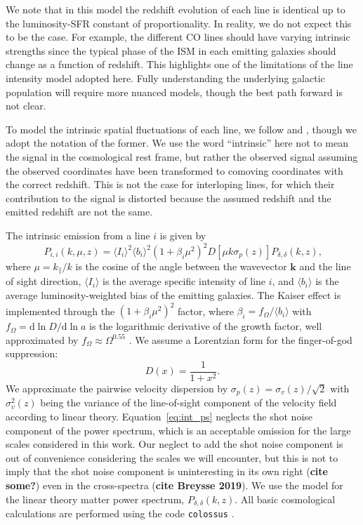 \documentclass{aastex62}
\newcommand{\beq}{\begin{equation}}
\newcommand{\eeq}{\end{equation}}
\newcommand{\avg}[1]{\ensuremath{\langle #1 \rangle}}
\begin{document}
We note that in this model the redshift evolution of each line is identical up
to the luminosity-SFR constant of proportionality. In reality, we do not
expect this to be the case. For example, the different CO lines should have
varying intrinsic strengths since the typical phase of the ISM in each
emitting galaxies should change as a function of redshift. This highlights one
of the limitations of the line intensity model adopted here. Fully
understanding the underlying galactic population will require more nuanced
models, though the best path forward is not clear.

To model the intrinsic spatial fluctuations of each line, we follow
\citet{2016ApJ...825..143L} and \citet{2016ApJ...832..165C}, though we adopt
the notation of the former. We use the word ``intrinsic'' here not to mean the
signal in the cosmological rest frame, but rather the observed signal assuming
the observed coordinates have been transformed to comoving coordinates with
the correct redshift. This is not the case for interloping lines, for which
their contribution to the signal is distorted because the assumed redshift and
the emitted redshift are not the same. 

The intrinsic emission from a line $i$ is given by
\beq\label{eq:int_ps}
P_{i,i}(k, \mu, z) = \avg{I_i}^2 \avg{b_i}^2 (1 + \beta_i \mu^2)^2 
              D\left[\mu k \sigma_p(z)\right] P_{\delta, \delta}(k, z)\text{,}
\eeq
where $\mu=k_{\parallel}/k$ is the cosine of the angle between the wavevector
$\bm{k}$ and the line of sight direction, $\avg{I_i}$ is the average specific
intensity of line $i$, and $\avg{b_i}$ is the average luminosity-weighted bias
of the emitting galaxies. The Kaiser effect \citep{1987MNRAS.227....1K} is implemented
through the $(1 + \beta_i \mu^2)^2$ factor, where $\beta_i =
f_{\Omega}/\avg{b_i}$ with $f_{\Omega} = \text{d}\ln{D}/\text{d}\ln{a}$ is the
logarithmic derivative of the growth factor, well approximated by $f_{\Omega}
\approx \Omega^{0.55}$ \citep{2005PhRvD..72d3529L}. We assume a Lorentzian form for the
finger-of-god suppression:
\beq\label{eq:fog}
D(x) = \frac{1}{1+x^2}\text{.}
\eeq
We approximate the pairwise velocity dispersion by $\sigma_p(z) =
\sigma_v(z)/\sqrt{2}$ with $\sigma_v^2(z)$ being the variance of the
line-of-sight component of the velocity field according to linear theory.
Equation~\eqref{eq:int_ps} neglects the shot noise component of the power
spectrum, which is an acceptable omission for the large scales considered in
this work. Our neglect to add the shot noise component is out of convenience considering the scales we will encounter, but this is not to imply that the shot noise component is uninteresting in its own right ({\bf cite some?}) even in the cross-spectra ({\bf cite Breysse 2019}). We use the \citet{1998ApJ...496..605E} model for the linear theory
matter power spectrum, $P_{\delta,\delta}(k, z)$. All basic cosmological
calculations are performed using the code \texttt{colossus} \citep{2018ApJS..239...35D}.
\end{document}

